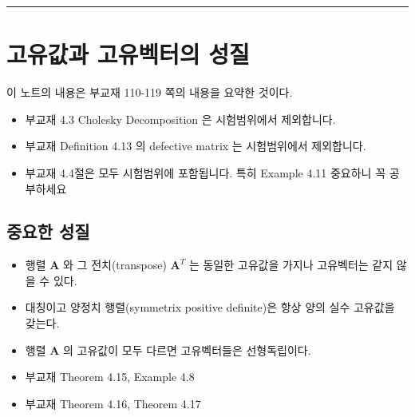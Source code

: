 \documentclass[
  11pt,
  a4paper,
  oneside]{scrbook}
\theoremstyle{definition}
\theoremstyle{definition}
\theoremstyle{plain}
\theoremstyle{remark}
\begin{document}
\begin{center}\rule{0.5\linewidth}{0.5pt}\end{center}


\chapter{고유값과 고유벡터의 성질}\label{eigen-02}

\begin{tcolorbox}[enhanced jigsaw, colback=white, colframe=quarto-callout-note-color-frame, opacityback=0, toprule=.15mm, leftrule=.75mm, titlerule=0mm, opacitybacktitle=0.6, title=\textcolor{quarto-callout-note-color}{\faInfo}\hspace{0.5em}{노트}, colbacktitle=quarto-callout-note-color!10!white, breakable, bottomrule=.15mm, bottomtitle=1mm, toptitle=1mm, arc=.35mm, left=2mm, rightrule=.15mm, coltitle=black]

이 노트의 내용은 부교재 110-119 쪽의 내용을 요약한 것이다.

\begin{itemize}
\item
  부교재 4.3 Cholesky Decomposition 은 시험범위에서 제외합니다.
\item
  부교재 Definition 4.13 의 defective matrix 는 시험범위에서 제외합니다.
\item
  부교재 4.4절은 모두 시험범위에 포함됩니다. 특히 Example 4.11 중요하니
  꼭 공부하세요
\end{itemize}

\end{tcolorbox}

\section{중요한 성질}\label{uxc911uxc694uxd55c-uxc131uxc9c8}

\begin{itemize}
\item
  행렬 \(\pmb A\) 와 그 전치(transpose) \({\pmb A}^T\) 는 동일한
  고유값을 가지나 고유벡터는 같지 않을 수 있다.
\item
  대칭이고 양정치 행렬(symmetrix positive definite)은 항상 양의 실수
  고유값을 갖는다.
\item
  행렬 \(\pmb A\) 의 고유값이 모두 다르면 고유벡터들은 선형독립이다.
\item
  부교재 Theorem 4.15, Example 4.8
\item
  부교재 Theorem 4.16, Theorem 4.17
\end{itemize}
\end{document}
